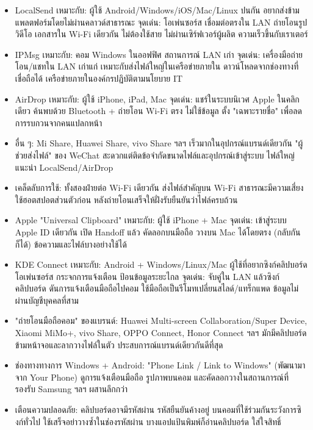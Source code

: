 
\begin{itemize}
  \item LocalSend เหมาะกับ: ผู้ใช้ Android/Windows/iOS/Mac/Linux ปนกัน อยากส่งข้ามแพลตฟอร์มโดยไม่ผ่านคลาวด์สาธารณะ จุดเด่น: โอเพ่นซอร์ส เชื่อมต่อตรงใน LAN ถ่ายโอนรูป วิดีโอ เอกสารใน Wi-Fi เดียวกัน ไม่ต้องใช้สาย ไม่ผ่านเซิร์ฟเวอร์ผู้ผลิต ความเร็วขึ้นกับเราเตอร์
  \item IPMsg เหมาะกับ: คอม Windows ในออฟฟิศ สถานการณ์ LAN เก่า จุดเด่น: เครื่องมือถ่ายโอน/แชทใน LAN เก่าแก่ เหมาะกับส่งไฟล์ใหญ่ในเครือข่ายภายใน ดาวน์โหลดจากช่องทางที่เชื่อถือได้ เครือข่ายภายในองค์กรปฏิบัติตามนโยบาย IT
  \item AirDrop เหมาะกับ: ผู้ใช้ iPhone, iPad, Mac จุดเด่น: แชร์ในระบบนิเวศ Apple ในคลิกเดียว ค้นพบด้วย Bluetooth + ถ่ายโอน Wi-Fi ตรง ไม่ใช้ข้อมูล ตั้ง "เฉพาะรายชื่อ" เพื่อลดการรบกวนจากคนแปลกหน้า
  \item อื่น ๆ: Mi Share, Huawei Share, vivo Share ฯลฯ เร็วมากในอุปกรณ์แบรนด์เดียวกัน "ผู้ช่วยส่งไฟล์" ของ WeChat สะดวกแต่ติดข้อจำกัดขนาดไฟล์และอุปกรณ์เข้าสู่ระบบ ไฟล์ใหญ่แนะนำ LocalSend/AirDrop
  \item เคล็ดลับการใช้: ทั้งสองฝ่ายต่อ Wi-Fi เดียวกัน ส่งไฟล์สำคัญบน Wi-Fi สาธารณะมีความเสี่ยง ใช้ฮอตสปอตส่วนตัวก่อน หลังถ่ายโอนเสร็จให้ฝั่งรับยืนยันว่าไฟล์ครบถ้วน
\end{itemize}


\begin{itemize}
  \item Apple "Universal Clipboard" เหมาะกับ: ผู้ใช้ iPhone + Mac จุดเด่น: เข้าสู่ระบบ Apple ID เดียวกัน เปิด Handoff แล้ว คัดลอกบนมือถือ วางบน Mac ได้โดยตรง (กลับกันก็ได้) ข้อความและไฟล์บางอย่างใช้ได้
  \item KDE Connect เหมาะกับ: Android + Windows/Linux/Mac ผู้ใช้ที่อยากซิงก์คลิปบอร์ดโอเพ่นซอร์ส กระจกการแจ้งเตือน ป้อนข้อมูลระยะไกล จุดเด่น: จับคู่ใน LAN แล้วซิงก์คลิปบอร์ด ดันการแจ้งเตือนมือถือไปคอม ใช้มือถือเป็นรีโมทเปลี่ยนสไลด์/แทร็กแพด ข้อมูลไม่ผ่านบัญชีบุคคลที่สาม
  \item "ถ่ายโอนมือถือคอม" ของแบรนด์: Huawei Multi-screen Collaboration/Super Device, Xiaomi MiMo+, vivo Share, OPPO Connect, Honor Connect ฯลฯ มักมีคลิปบอร์ดข้ามหน้าจอและลากวางไฟล์ในตัว ประสบการณ์แบรนด์เดียวกันดีที่สุด
  \item ช่องทางทางการ Windows + Android: "Phone Link / Link to Windows" (พัฒนามาจาก Your Phone) ดูการแจ้งเตือนมือถือ รูปภาพบนคอม และคัดลอกวางในสถานการณ์ที่รองรับ Samsung ฯลฯ ผสานลึกกว่า
  \item เตือนความปลอดภัย: คลิปบอร์ดอาจมีรหัสผ่าน รหัสยืนยันค้างอยู่ บนคอมที่ใช้ร่วมกันระวังการซิงก์ทั่วไป ใช้เสร็จอย่าวางซ้ำในช่องรหัสผ่าน บางแอปแป้นพิมพ์ก็อ่านคลิปบอร์ด ใส่ใจสิทธิ์
\end{itemize}

